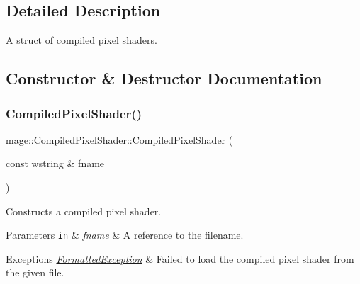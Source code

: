 \subsection{Detailed Description}
A struct of compiled pixel shaders. 

\subsection{Constructor \& Destructor Documentation}
\hypertarget{structmage_1_1_compiled_pixel_shader_a1c8cc509e405a53456dff36c204ec353}{}\label{structmage_1_1_compiled_pixel_shader_a1c8cc509e405a53456dff36c204ec353} 
\subsubsection{\texorpdfstring{Compiled\+Pixel\+Shader()}{CompiledPixelShader()}\hspace{0.1cm}{\footnotesize\ttfamily [1/4]}}
{\footnotesize\ttfamily mage\+::\+Compiled\+Pixel\+Shader\+::\+Compiled\+Pixel\+Shader (\begin{DoxyParamCaption}\item[{const wstring \&}]{fname }\end{DoxyParamCaption})\hspace{0.3cm}{\ttfamily [explicit]}}

Constructs a compiled pixel shader.


\begin{DoxyParams}[1]{Parameters}
\mbox{\tt in}  & {\em fname} & A reference to the filename. \\
\hline
\end{DoxyParams}

\begin{DoxyExceptions}{Exceptions}
{\em \hyperlink{structmage_1_1_formatted_exception}{Formatted\+Exception}} & Failed to load the compiled pixel shader from the given file. \\
\hline
\end{DoxyExceptions}
\hypertarget{structmage_1_1_compiled_pixel_shader_a0952d4118e0d7d259b6034a52182ed6c}{}\label{structmage_1_1_compiled_pixel_shader_a0952d4118e0d7d259b6034a52182ed6c} 
